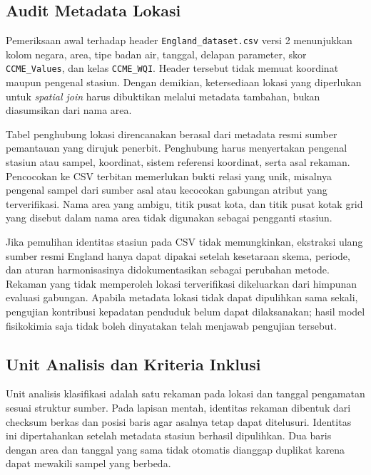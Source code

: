 \subsection{Audit Metadata Lokasi}

Pemeriksaan awal terhadap header \texttt{England\_dataset.csv} versi 2 menunjukkan kolom negara, area, tipe badan air, tanggal, delapan parameter, skor \texttt{CCME\_Values}, dan kelas \texttt{CCME\_WQI}. Header tersebut tidak memuat koordinat maupun pengenal stasiun. Dengan demikian, ketersediaan lokasi yang diperlukan untuk \textit{spatial join} harus dibuktikan melalui metadata tambahan, bukan diasumsikan dari nama area.

Tabel penghubung lokasi direncanakan berasal dari metadata resmi sumber pemantauan yang dirujuk penerbit. Penghubung harus menyertakan pengenal stasiun atau sampel, koordinat, sistem referensi koordinat, serta asal rekaman. Pencocokan ke CSV terbitan memerlukan bukti relasi yang unik, misalnya pengenal sampel dari sumber asal atau kecocokan gabungan atribut yang terverifikasi. Nama area yang ambigu, titik pusat kota, dan titik pusat kotak grid yang disebut dalam nama area tidak digunakan sebagai pengganti stasiun.

Jika pemulihan identitas stasiun pada CSV tidak memungkinkan, ekstraksi ulang sumber resmi England hanya dapat dipakai setelah kesetaraan skema, periode, dan aturan harmonisasinya didokumentasikan sebagai perubahan metode. Rekaman yang tidak memperoleh lokasi terverifikasi dikeluarkan dari himpunan evaluasi gabungan. Apabila metadata lokasi tidak dapat dipulihkan sama sekali, pengujian kontribusi kepadatan penduduk belum dapat dilaksanakan; hasil model fisikokimia saja tidak boleh dinyatakan telah menjawab pengujian tersebut.

\subsection{Unit Analisis dan Kriteria Inklusi}

Unit analisis klasifikasi adalah satu rekaman pada lokasi dan tanggal pengamatan sesuai struktur sumber. Pada lapisan mentah, identitas rekaman dibentuk dari checksum berkas dan posisi baris agar asalnya tetap dapat ditelusuri. Identitas ini dipertahankan setelah metadata stasiun berhasil dipulihkan. Dua baris dengan area dan tanggal yang sama tidak otomatis dianggap duplikat karena dapat mewakili sampel yang berbeda.


